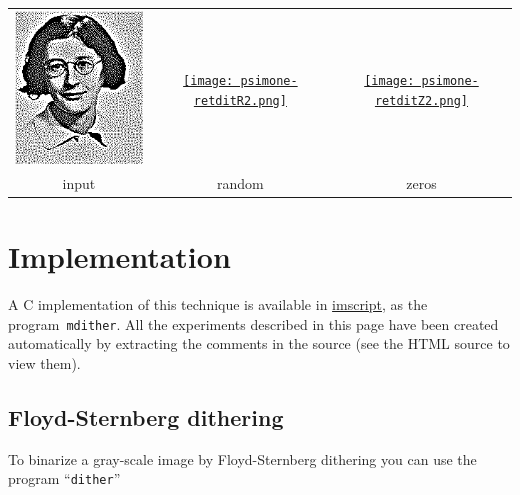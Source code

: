 \begin{tabular}{ccc}
	\href{z-psimone-retdit.png}{\includegraphics{psimone-retdit.png}}&
	\href{z-psimone-retditR2.png}{\texttt{[image: psimone-retditR2.png]}}&
	\href{z-psimone-retditZ2.png}{\texttt{[image: psimone-retditZ2.png]}}\\
	input & random & zeros
\end{tabular}

\section{Implementation}

A C implementation of this technique is available in
\href{https://github.com/mnhrdt/imscript/blob/master/src/mdither.c}{imscript},
as the program~\verb+mdither+.  All the experiments described in this page
have been created automatically by extracting the comments in the source (see
the HTML source to view them).


\subsection{Floyd-Sternberg dithering}

To binarize a gray-scale image by Floyd-Sternberg dithering you can use the
program ``\verb+dither+''

